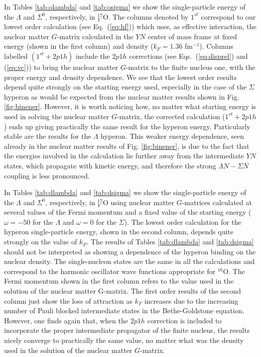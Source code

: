 In Tables \ref{tab:olambda} and \ref{tab:osigma} we show the
single-particle
energy of the $\Lambda$ and $\Sigma^0$, respectively, in $^{17}_Y$O.
The
columns denoted by $1^{st}$ correspond to our lowest order calculation
(see
Eq.~(\ref{eq:hf})) which uses, as effective interaction, the nuclear
matter $G$-matrix calculated in the $YN$ center of mass frame
at fixed energy (shown in the first column) and density ($k_F=1.36$
fm$^{-1}$).
Columns labelled $(1^{st}+ 2p1h)$ include the $2p1h$ corrections (see
Eqs.~(\ref{eq:disprel}) and (\ref{eq:vc})) to bring the nuclear
matter $G$-matrix to the finite nucleus one, with the proper
energy
and density dependence. We see that the lowest order results depend
quite strongly on the starting energy used, especially in the case
of the $\Sigma$ hyperon as would be expected from the nuclear matter
results shown in Fig. \ref{fig:binener}. However, it is worth noticing
how,
no matter what
starting energy is used in solving the nuclear matter $G$-matrix, the
corrected
calculation ($1^{st}+2p1h$) ends up giving practically the same result
for the hyperon
energy. Particularly stable are the results for the $\Lambda$ hyperon.
This weaker energy dependence, seen already in the nuclear matter
results of Fig. \ref{fig:binener}, is due to the fact that the energies
involved in the calculation lie further away from the
intermediate $YN$ states, which propagate with kinetic energy,
and therefore the strong $\Lambda N-\Sigma N$ coupling is less
pronounced.

In Tables \ref{tab:dlambda} and \ref{tab:dsigma} we show the
single-particle
energy of the $\Lambda$ and $\Sigma^0$, respectively, in $^{17}_Y$O
using nuclear matter $G$-matrices calculated at several values of the Fermi momentum
and a
fixed value of the starting energy ($\omega=-50$ for the $\Lambda$ and
$\omega=0$ for the $\Sigma$).
The lowest order calculation for the hyperon single-particle energy, shown
in the second column, depends quite strongly on the value of $k_F$.
The results of Tables \ref{tab:dlambda} and \ref{tab:dsigma} should
not be interpreted as showing a dependence of the hyperon binding on
the nuclear density. The single-nucleon states are the same in all the
calculations and correspond to the harmonic oscillator wave functions
appropriate for $^{16}$O. The Fermi momentum shown in the first column
refers
to the value used in the solution of the nuclear matter G-matrix. The
first order results of the second column just show the loss of
attraction
as $k_F$ increases due to the increasing number of Pauli
blocked intermediate states in the Bethe-Goldstone equation.
However, one finds again that, when the $2p1h$ correction is included
to incorporate the proper intermediate propagator of the finite
nucleus, the results nicely converge to practically the same value, no
matter what was the density used in the solution of the nuclear matter
$G$-matrix.

